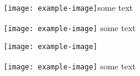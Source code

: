 \texttt{[image: 
	example-image]}some text

\texttt{[image: 
	example-image]} some text

\texttt{[image: 
	example-image]} %

\texttt{[image: 
	example-image]}  some text
